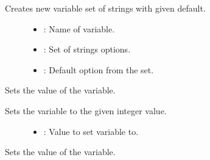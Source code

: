 \documentclass[letterpaper,10pt,english]{sphinxmanual}
\begin{document}
\begin{fulllineitems}
\begin{fulllineitems}
Creates new variable set of strings with given default. \begin{description}
\item[{}] \leavevmode\begin{itemize}
\item {} 
: Name of variable. 

\item {} 
: Set of strings options. 

\item {} 
: Default option from the set. 

\end{itemize}

\end{description}


\end{fulllineitems}


\begin{fulllineitems}
\label{\detokenize{index:_CPPv2N7ostendo3VaraSEi}}%
\pysigstartmultiline
{}\label{\detokenize{index:Pessumstructostendo_1_1Var_1a89b2842e7aad2fdf3ae21070655bb436}}%
\pysigstopmultiline
Sets the value of the variable. 

Sets the variable to the given integer value. \begin{description}
\item[{}] \leavevmode\begin{itemize}
\item {} 
: Value to set variable to. 

\end{itemize}

\end{description}


\end{fulllineitems}


\begin{fulllineitems}
\label{\detokenize{index:_CPPv2N7ostendo3VaraSEd}}%
\pysigstartmultiline
{}\label{\detokenize{index:Pessumstructostendo_1_1Var_1a828c7ab4e4b53030cea5e94aa34d84d5}}%
\pysigstopmultiline
Sets the value of the variable. 


\end{fulllineitems}
\end{fulllineitems}
\end{document}
